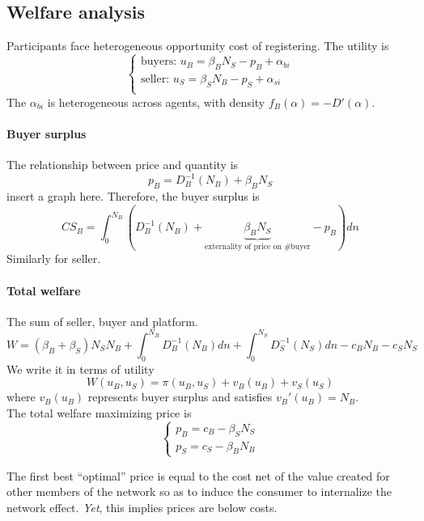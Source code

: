 \subsection{Welfare analysis}
Participants face heterogeneous opportunity cost of registering.
The utility is 
\begin{equation*}
    \begin{cases}
        \text{buyers: } u_B=\beta_B N_S-p_B+\alpha_{bi}\\
        \text{seller: } u_S=\beta_S N_B-p_S+\alpha_{si}\\
    \end{cases}
\end{equation*}
The $\alpha_{bi}$ is heterogeneous across agents, with density $f_B(\alpha)=-D'(\alpha)$.
\paragraph{Buyer surplus} 
The relationship between price and quantity is \begin{equation*}
    p_B=D_B^{-1}(N_B)+\beta_B N_S
\end{equation*}
insert a graph here.
Therefore, the buyer surplus is \begin{equation*}
    CS_B=\int_0^{N_B} (D_B^{-1}(N_B)+\underbrace{\beta_B N_S}_\text{externality of price on \# buyer}-p_B) dn
\end{equation*}
Similarly for seller.
\paragraph{Total welfare} The sum of seller, buyer and platform.
\begin{equation*}
    W=(\beta_B+\beta_S) N_S N_B + \int_0^{N_B} D_B^{-1}(N_B) dn +\int_0^{N_S} D_S^{-1}(N_S) dn-c_B N_B-c_S N_S
\end{equation*}
We write it in terms of utility \begin{equation*}
    W(u_B,u_S)=\pi(u_B,u_S)+v_B(u_B)+v_S(u_S)
\end{equation*}
where $v_B(u_B)$ represents buyer surplus and satisfies $v_B'(u_B)=N_B$.\\
The total welfare maximizing price is \begin{equation*}
    \begin{cases}
        p_B=c_B-\beta_S N_S\\
        p_S=c_S-\beta_B N_B
    \end{cases}
\end{equation*}
\begin{remark}
    The first best “optimal” price is equal to the cost net of the value created for other members of the network so as to induce the consumer to internalize the network effect. \emph{Yet}, this implies prices are below costs.
\end{remark}
